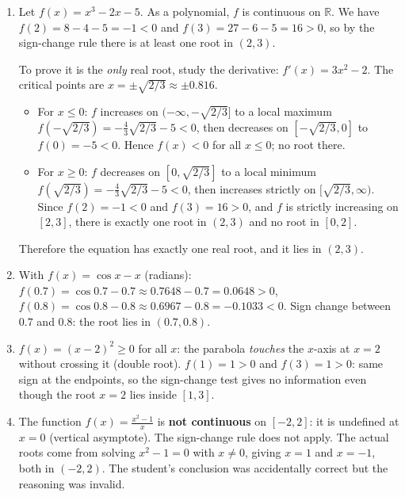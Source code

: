 \documentclass[11pt]{article}
\begin{document}
\begin{corrige}[Exercise 1]
\begin{enumerate}
\item Let $f(x) = x^3 - 2x - 5$. As a polynomial, $f$ is continuous on $\mathbb{R}$. We have $f(2) = 8 - 4 - 5 = -1 < 0$ and $f(3) = 27 - 6 - 5 = 16 > 0$, so by the sign-change rule there is at least one root in $(2,3)$.

To prove it is the \emph{only} real root, study the derivative: $f'(x) = 3x^2 - 2$. The critical points are $x = \pm\sqrt{2/3} \approx \pm 0.816$.
\begin{itemize}
\item For $x \le 0$: $f$ increases on $(-\infty, -\sqrt{2/3}]$ to a local maximum $f(-\sqrt{2/3}) = -\frac{4}{3}\sqrt{2/3} - 5 < 0$, then decreases on $[-\sqrt{2/3}, 0]$ to $f(0) = -5 < 0$. Hence $f(x) < 0$ for all $x \le 0$; no root there.
\item For $x \ge 0$: $f$ decreases on $[0, \sqrt{2/3}]$ to a local minimum $f(\sqrt{2/3}) = -\frac{4}{3}\sqrt{2/3} - 5 < 0$, then increases strictly on $[\sqrt{2/3}, \infty)$. Since $f(2) = -1 < 0$ and $f(3) = 16 > 0$, and $f$ is strictly increasing on $[2,3]$, there is exactly one root in $(2,3)$ and no root in $[0,2]$.
\end{itemize}
Therefore the equation has exactly one real root, and it lies in $(2,3)$.

\item With $f(x) = \cos x - x$ (radians): 
$f(0.7) = \cos 0.7 - 0.7 \approx 0.7648 - 0.7 = 0.0648 > 0$,
$f(0.8) = \cos 0.8 - 0.8 \approx 0.6967 - 0.8 = -0.1033 < 0$.
Sign change between $0.7$ and $0.8$: the root lies in $(0.7, 0.8)$.

\item $f(x) = (x-2)^2 \ge 0$ for all $x$: the parabola \emph{touches} the $x$-axis at $x = 2$ without crossing it (double root). $f(1) = 1 > 0$ and $f(3) = 1 > 0$: same sign at the endpoints, so the sign-change test gives no information even though the root $x = 2$ lies inside $[1,3]$.

\item The function $f(x) = \frac{x^2-1}{x}$ is \textbf{not continuous} on $[-2, 2]$: it is undefined at $x = 0$ (vertical asymptote). The sign-change rule does not apply. The actual roots come from solving $x^2 - 1 = 0$ with $x \neq 0$, giving $x = 1$ and $x = -1$, both in $(-2, 2)$. The student's conclusion was accidentally correct but the reasoning was invalid.
\end{enumerate}
\end{corrige}
\end{document}
